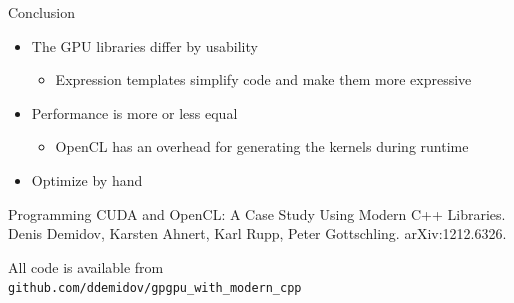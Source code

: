 \documentclass{beamer}
\newcommand{\rem}[1]{}
\newcommand{\heading}[1]{\centerline{\Large #1} \vspace{0.5em}}
\begin{document}
\begin{frame}[fragile]
 \heading{Conclusion}

 \begin{itemize}
  \item The GPU libraries differ by usability
  \begin{itemize} \item Expression templates simplify code and make them more expressive \end{itemize}
  \item Performance is more or less equal
  \begin{itemize} \item OpenCL has an overhead for generating the kernels during runtime \end{itemize}
  \item Optimize by hand
 \end{itemize}

 \vspace{2ex}
 {\scriptsize Programming CUDA and OpenCL: A Case Study Using Modern C++ Libraries. Denis Demidov, Karsten Ahnert, Karl Rupp, Peter Gottschling. arXiv:1212.6326.}

 \vspace{4ex}
 \begin{center}
   \rem{\scriptsize} All code is available from \\ {\tt github.com/ddemidov/gpgpu\_with\_modern\_cpp}
 \end{center}

\end{frame}





\rem{




%



%
}
\end{document}
